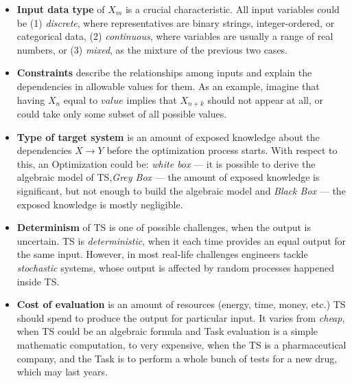 \begin{itemize}[itemsep=8pt]
	\item \textbf{Input data type} of $X_m$ is a crucial characteristic. All input variables could be (1) \emph{discrete}, where representatives are binary strings, integer-ordered, or categorical data, (2) \emph{continuous}, where variables are usually a range of real numbers, or (3) \emph{mixed}, as the mixture of the previous two cases.

	\item \textbf{Constraints} describe the relationships among inputs and explain the dependencies in allowable values for them. As an example, imagine that having $X_n$ equal to $value$ implies that $X_{n + k}$ should not appear at all, or could take only some subset of all possible values.
	
	\item \textbf{Type of target system} is an amount of exposed knowledge about the dependencies $X \rightarrow Y$ before the optimization process starts. With respect to this, an Optimization could be: \emph{white box} — it is possible to derive the algebraic model of TS,\emph{Grey Box} — the amount of exposed knowledge is significant, but not enough to build the algebraic model and \emph{Black Box} — the exposed knowledge is mostly negligible.


	\item \textbf{Determinism} of TS is one of possible challenges, when the output is uncertain. TS is \emph{deterministic}, when it each time provides an equal output for the same input. However, in most real-life challenges engineers tackle \emph{stochastic} systems, whose output is affected by random processes happened inside TS. 

	\item \textbf{Cost of evaluation} is an amount of resources (energy, time, money, etc.) TS should spend to produce the output for particular input. It varies from \emph{cheap}, when TS could be an algebraic formula and Task evaluation is a simple mathematic computation, to very expensive, when the TS is a pharmaceutical company, and the Task is to perform a whole bunch of tests for a new drug, which may last years. 


\end{itemize}
